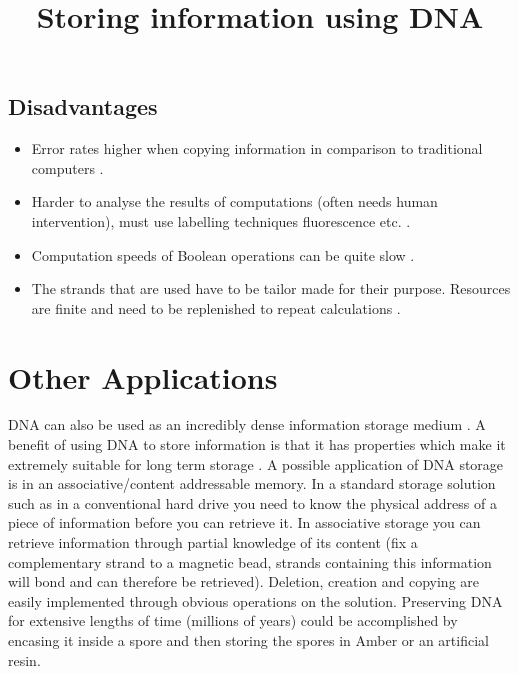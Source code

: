 \documentclass[11pt,a4paper,portrait]{article}
\begin{document}
\subsection{Disadvantages}
\begin{itemize}
\item Error rates higher when copying information in comparison to traditional computers \cite{Ezziane06}.
\item Harder to analyse the results of computations (often needs human intervention), must use labelling techniques fluorescence etc. \cite{Adleman1994}\cite{DeoxyribozymeLogic}\cite{enzymefree}\cite{Tiles00}.
\item Computation speeds of Boolean operations can be quite slow \cite{Lederman2006}\cite{MAYA2}.
\item The strands that are used have to be tailor made for their purpose. Resources are finite and need to be replenished to repeat calculations \cite{Adleman1994}.
\end{itemize}

\clearpage
\section{Other Applications}
\title{Storing information using DNA}
DNA can also be used as an incredibly dense information storage medium \cite{DNAstorage}. A benefit of using DNA to store information is that it has properties which make it extremely suitable for long term storage \cite{Cox2001}.  A possible application of DNA storage is in an associative/content addressable memory. \cite{Baum583} In a standard storage solution such as in a conventional hard drive you need to know the physical address of a piece of information before you can retrieve it. In associative storage you can retrieve information through partial knowledge of its content (fix a complementary strand to a magnetic bead, strands containing this information will bond and can therefore be retrieved\cite{Baum583}). Deletion, creation and copying are easily implemented through obvious operations on the solution. Preserving DNA for extensive lengths of time (millions of years) could be accomplished by encasing it inside a spore and then storing the spores in Amber or an artificial resin. \cite{Cox2001} 


\clearpage
\end{document}
